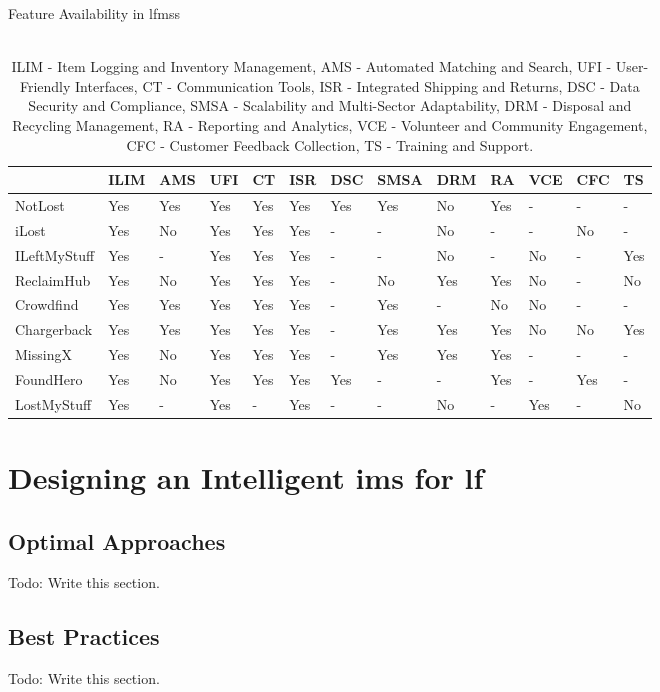 \begin{table}[!htb]
\centering
\caption{Feature Availability in \acl{lfms}s}
\begin{tabular}{lllllllllllll}
    \toprule
    {} & ILIM & AMS & UFI & CT & ISR & DSC & SMSA & DRM & RA & VCE & CFC & TS \\
    \midrule
    NotLost & Yes & Yes & Yes & Yes & Yes & Yes & Yes & No & Yes & - & - & - \\
    iLost & Yes & No & Yes & Yes & Yes & - & - & No & - & - & No & - \\
    ILeftMyStuff & Yes & - & Yes & Yes & Yes & - & - & No & - & No & - & Yes \\
    ReclaimHub & Yes & No & Yes & Yes & Yes & - & No & Yes & Yes & No & - & No \\
    Crowdfind & Yes & Yes & Yes & Yes & Yes & - & Yes & - & No & No & - & - \\
    Chargerback & Yes & Yes & Yes & Yes & Yes & - & Yes & Yes & Yes & No & No & Yes \\
    MissingX & Yes & No & Yes & Yes & Yes & - & Yes & Yes & Yes & - & - & - \\
    FoundHero & Yes & No & Yes & Yes & Yes & Yes & - & - & Yes & - & Yes & - \\
    LostMyStuff & Yes & - & Yes & - & Yes & - & - & No & - & Yes & - & No \\
    \bottomrule
\end{tabular}
\caption*{\\ILIM - Item Logging and Inventory Management, AMS - Automated Matching and Search, UFI - User-Friendly Interfaces, CT - Communication Tools, ISR - Integrated Shipping and Returns, DSC - Data Security and Compliance, SMSA - Scalability and Multi-Sector Adaptability, DRM - Disposal and Recycling Management, RA - Reporting and Analytics, VCE - Volunteer and Community Engagement, CFC - Customer Feedback Collection, TS - Training and Support.}
\label{tab:lfms_features}
\end{table}


\section{Designing an Intelligent \acl{ims} for \acl{lf}} \label{sec:designing-intelligent-ims}


\subsection{Optimal Approaches} \label{subsec:optimal-approaches}

Todo: Write this section.

\subsection{Best Practices} \label{subsec:best-practices}

Todo: Write this section.
 


